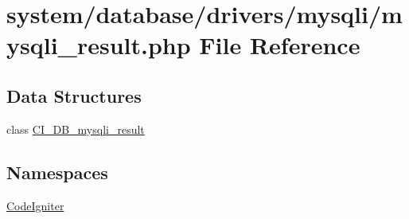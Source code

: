 \hypertarget{mysqli__result_8php}{}\section{system/database/drivers/mysqli/mysqli\+\_\+result.php File Reference}
\label{mysqli__result_8php}
\subsection*{Data Structures}
\begin{DoxyCompactItemize}
\item 
class \mbox{\hyperlink{class_c_i___d_b__mysqli__result}{C\+I\+\_\+\+D\+B\+\_\+mysqli\+\_\+result}}
\end{DoxyCompactItemize}
\subsection*{Namespaces}
\begin{DoxyCompactItemize}
\item 
 \mbox{\hyperlink{namespace_code_igniter}{Code\+Igniter}}
\end{DoxyCompactItemize}
